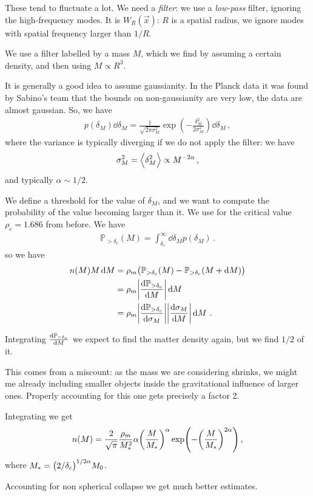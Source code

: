 \documentclass[main.tex]{subfiles}
\begin{document}
These tend to fluctuate a lot. We need a \emph{filter}: we use a \emph{low-pass} filter, ignoring the high-frequency modes. It is \(W_R(\vec{x})\): \(R\) is a spatial radius, we ignore modes with spatial frequency larger than \(1/R\). 

We use a filter labelled by a mass \(M\), which we find by assuming a certain density, and then using \(M \propto R^3\). 

It is generally a good idea to assume gaussianity. In the Planck data it was found by Sabino's team that the bounds on non-gaussianity are very low, the data are almost gaussian. So, we have 
%
\begin{align}
p(\delta_{M}) \dd{ \delta_{M}} = \frac{1}{\sqrt{2 \pi \sigma_{M}^2}} \exp( - \frac{ \delta_{M}^2}{2 \sigma_{M}^2}) \dd{ \delta_{M}}
\,,
\end{align}
%
where the variance is typically diverging if we do not apply the filter: we have 
%
\begin{align}
\sigma_{M}^2    = \expval{ \delta_{M}^2 } \propto M^{-2 \alpha }
\,,
\end{align}
%
and typically \(\alpha \sim 1/2\). 

We define a threshold for the value of \(\delta_{M}\), and we want to compute the probability of the value becoming larger than it. 
We use for the critical value \(\rho_{c} = 1.686   \) from before. 
We have 
%
\begin{align}
\mathbb{P}_{> \delta_{c}}(M) = \int_{ \delta_{c}}^{ \infty } \dd{ \delta_{M}} p( \delta_{M})
\,.
\end{align}
%
so we have 
%
\begin{subequations}
\begin{align}
n(M) M \dd{M} 
&= \rho_{m} \qty(\mathbb{P}_{ > \delta_{c}} (M) - \mathbb{P}_{ > \delta_{c}} (M + \dd{M})) \\
&= \rho_{m} \abs{ \dv{\mathbb{P}_{> \delta_{c}}}{M}} \dd{M}  \\
&= \rho_{m} \abs{ \dv{\mathbb{P}_{> \delta_{c}}}{ \sigma_{M}}} \abs{ \dv{\sigma_{M}}{M}} \dd{M}
\,.
\end{align}
\end{subequations}

Integrating \( \dv{\mathbb{P}_{> \delta_{c}}}{M}\) we expect to find the matter density again, but we find \(1/2\) of it. 

This comes from a miscount: as the mass we are considering shrinks, we might me already including smaller objects inside the gravitational influence of larger ones. Properly accounting for this one gets precisely a factor 2. 

Integrating we get 
%
\begin{align}
n(M) = \frac{2}{\sqrt{\pi }} \frac{\rho_{m}}{M_{*}^2}
\alpha \qty(\frac{M}{M_{*}})^{\alpha }
\exp(- \qty(\frac{M}{M_{*}})^{2 \alpha })
\,,
\end{align}
%
where \(M_{*} = \qty(2 / \delta_{c})^{ 1/ 2 \alpha } M_0 \). 

Accounting for non spherical collapse we get much better estimates.
\end{document}
